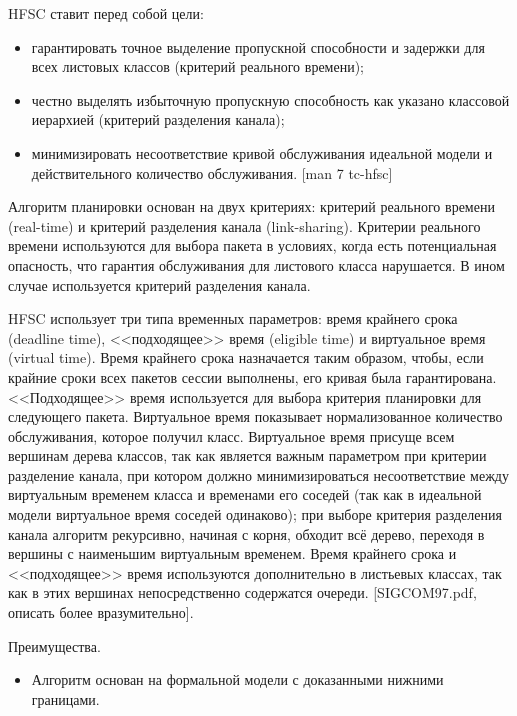 	
        HFSC ставит перед собой цели:
		\begin{itemize}
            \item гарантировать точное выделение пропускной способности и задержки для всех листовых классов (критерий реального времени);
            \item честно выделять избыточную пропускную способность как указано классовой иерархией (критерий разделения канала);
            \item минимизировать несоответствие кривой обслуживания идеальной модели и действительного количество обслуживания. [man 7 tc-hfsc]
		\end{itemize}

        Алгоритм планировки основан на двух критериях: критерий реального времени
        (real-time) и критерий разделения канала (link-sharing). Критерии реального времени
        используются для выбора пакета в условиях, когда есть потенциальная опасность,
        что гарантия обслуживания для листового класса нарушается. В ином случае
        используется критерий разделения канала.

        HFSC использует три типа временных параметров: время крайнего срока (deadline
        time), <<подходящее>> время (eligible time) и виртуальное время (virtual time). Время крайнего
        срока назначается таким образом, чтобы, если крайние сроки всех пакетов сессии
        выполнены, его кривая была гарантирована. <<Подходящее>> время используется для
        выбора критерия планировки для следующего пакета. Виртуальное время показывает
        нормализованное количество обслуживания, которое получил класс. Виртуальное
        время присуще всем вершинам дерева классов, так как является важным параметром
        при критерии разделение канала, при котором должно минимизироваться
        несоответствие между виртуальным временем класса и временами его соседей
        (так как в идеальной модели виртуальное время соседей одинаково); при выборе
        критерия разделения канала алгоритм рекурсивно, начиная с корня, обходит всё
        дерево, переходя в вершины с наименьшим виртуальным временем. Время крайнего
        срока и <<подходящее>> время используются дополнительно в листьевых классах,
        так как в этих вершинах непосредственно содержатся очереди. [SIGCOM97.pdf, описать
        более вразумительно].

        Преимущества.
		\begin{itemize}
            \item Алгоритм основан на формальной модели с доказанными нижними границами.
		\end{itemize}


